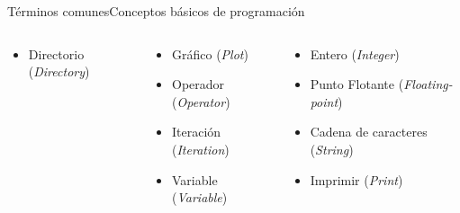 \documentclass[spanish]{beamer}
\begin{document}
\begin{frame}{Términos comunes}{Conceptos básicos de programación}
\begin{columns}
\begin{column}{0.33\textwidth}
\begin{itemize}
                \item Directorio (\textit{Directory})
            \end{itemize}
        \end{column}
        \begin{column}{0.33\textwidth}
            \begin{itemize}
                \item Gráfico (\textit{Plot})
                \item Operador (\textit{Operator})
                \item Iteración (\textit{Iteration})
                \item Variable (\textit{Variable})
            \end{itemize}
        \end{column}
        \begin{column}{0.33\textwidth}
            \begin{itemize}
                \item Entero (\textit{Integer})
                \item Punto Flotante (\textit{Floating-point})
                \item Cadena de caracteres (\textit{String})
                \item Imprimir (\textit{Print})
            \end{itemize}
        \end{column}
    \end{columns}
\end{frame}





\end{document}

